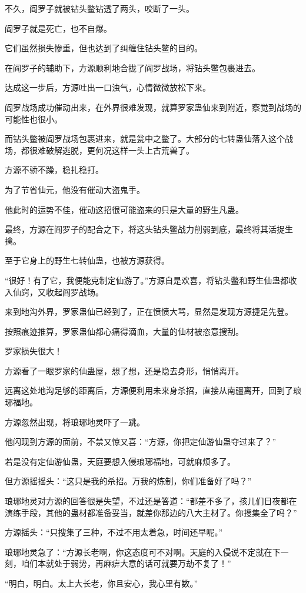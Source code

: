 \begin{this_body}
不久，阎罗子就被钻头鳖钻透了两头，咬断了一头。

阎罗子就是死亡，也不自爆。

它们虽然损失惨重，但也达到了纠缠住钻头鳖的目的。

在阎罗子的辅助下，方源顺利地合拢了阎罗战场，将钻头鳖包裹进去。

达成这一步后，方源吐出一口浊气，心情微微放松下来。

阎罗战场成功催动出来，在外界很难发现，就算罗家蛊仙来到附近，察觉到战场的可能性也很小。

而钻头鳖被阎罗战场包裹进来，就是瓮中之鳖了。大部分的七转蛊仙落入这个战场，都很难破解逃脱，更何况这样一头上古荒兽了。

方源不骄不躁，稳扎稳打。

为了节省仙元，他没有催动大盗鬼手。

他此时的运势不佳，催动这招很可能盗来的只是大量的野生凡蛊。

最终，方源在阎罗子的配合之下，将这头钻头鳖战力削弱到底，最终将其活捉生擒。

至于它身上的野生七转仙蛊，也被方源获得。

“很好！有了它，我便能克制定仙游了。”方源自是欢喜，将钻头鳖和野生仙蛊都收入仙窍，又收起阎罗战场。

来到地沟外界，罗家蛊仙已经到了，正在愤愤大骂，显然是发现方源捷足先登。

按照痕迹推算，罗家蛊仙都心痛得滴血，大量的仙材被恣意搜刮。

罗家损失很大！

方源看了一眼罗家的仙蛊屋，想了想，还是隐去身形，悄悄离开。

远离这处地沟足够的距离后，方源便利用未来身杀招，直接从南疆离开，回到了琅琊福地。

方源忽然出现，将琅琊地灵吓了一跳。

他闪现到方源的面前，不禁又惊又喜：“方源，你把定仙游仙蛊夺过来了？”

若是没有定仙游仙蛊，天庭要想入侵琅琊福地，可就麻烦多了。

但方源摇摇头：“这只是我的杀招。万我的炼制，你们准备好了吗？”

琅琊地灵对方源的回答很是失望，不过还是答道：“都差不多了，孩儿们日夜都在演练手段，其他的蛊材都准备妥当，就差你那边的八大主材了。你搜集全了吗？”

方源摇头：“只搜集了三种，不过不用太着急，时间还早呢。”

琅琊地灵急了：“方源长老啊，你这态度可不对啊。天庭的入侵说不定就在下一刻，咱们本就处于弱势，再麻痹大意的话可就要万劫不复了！”

“明白，明白。太上大长老，你且安心，我心里有数。”

\end{this_body}

